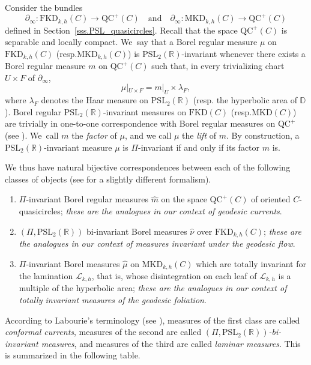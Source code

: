 \documentclass[11pt]{article}
\newcommand{\resp}{resp.\xspace}
\theoremstyle{plain}
\theoremstyle{definition}
\newcommand\PSL{\mathrm{PSL}_2(\mathbb{R})}
\newcommand{\D}{{\mathbb D}}
\newcommand{\cL}{{\mathcal L}}
\newcommand{\QC}{\mathrm{QC}}
\newcommand{\MKD}{\mathrm{MKD}}
\newcommand{\FKD}{\mathrm{FKD}}
\newcommand{\bord}{\partial_{\infty}}
\begin{document}
Consider the bundles
\[
\bord:\FKD_{k,h}(C)\to\QC^+(C)\quad\text{and}\quad \bord:\MKD_{k,h}(C)\to\QC^+(C)
\]
defined in Section~\ref{sss.PSL_quasicircles}. Recall that the space $\QC^+(C)$ is separable and locally compact. We~say that a Borel regular measure $\mu$ on $\FKD_{k,h}(C)$ (\resp $\MKD_{k,h}(C)$) is $\PSL$-invariant whenever there exists a Borel regular measure $m$ on $\QC^+(C)$ such that, in every trivializing chart $U\times F$ of $\bord$,
\begin{equation*}
\mu|_{U\times F}=m|_U\times\lambda_F,
\end{equation*}
where $\lambda_F$ denotes the Haar measure on $\PSL$ (\resp the hyperbolic area of $\D$). Borel regular $\PSL$-invariant measures on $\FKD(C)$ (\resp $\MKD(C)$) are trivially in one-to-one correspondence with Borel regular measures on $\QC^+$ (see \cite[Lem.\,4.2.1]{ALS}). We~call $m$ the \emph{factor} of $\mu$, and we call $\mu$ the \emph{lift} of $m$. By construction, a $\PSL$-invariant measure $\mu$ is $\Pi$-invariant if and only if its factor $m$ is.

We thus have natural bijective correspondences between each of the following classes of objects (see \cite[\S 4.2]{ALS} for a slightly different formalism).
\begin{enumerate}
\item $\Pi$-invariant Borel regular measures $\hat m$ on the space $\QC^+(C)$ of oriented $C$\nobreakdash-quasicircles; \emph{these are the analogues in our context of geodesic currents}.
\item $(\Pi,\PSL)$ bi-invariant Borel measures $\hat\nu$ over $\FKD_{k,h}(C)$; \emph{these are the analogues in our context of measures invariant under the geodesic flow}.
\item $\Pi$-invariant Borel measures $\hat\mu$ on $\MKD_{k,h}(C)$ which are totally invariant for the lamination $\cL_{k,h}$, that is, whose disintegration on each leaf of $\cL_{k,h}$ is a multiple of the hyperbolic area; \emph{these are the analogues in our context of totally invariant measures of the geodesic foliation}.
\end{enumerate}

According to Labourie's terminology (see \cite{LabourieBourbaki,MN_currents}), measures of the first class are called \emph{conformal currents}, measures of the second are called \emph{$(\Pi,\PSL)$-bi-invariant measures}, and measures of the third are called \emph{laminar measures}. This is summarized in the following table.
\end{document}
